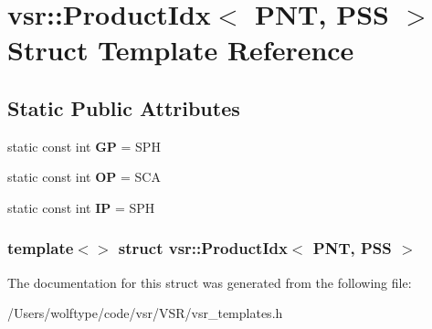 \hypertarget{structvsr_1_1_product_idx_3_01_p_n_t_00_01_p_s_s_01_4}{\section{vsr\-:\-:Product\-Idx$<$ P\-N\-T, P\-S\-S $>$ Struct Template Reference}
\label{structvsr_1_1_product_idx_3_01_p_n_t_00_01_p_s_s_01_4}
}
\subsection*{Static Public Attributes}
\begin{DoxyCompactItemize}
\item 
\hypertarget{structvsr_1_1_product_idx_3_01_p_n_t_00_01_p_s_s_01_4_a52a0db636d39e685db40b9f470a5c3cb}{static const int {\bfseries G\-P} = S\-P\-H}\label{structvsr_1_1_product_idx_3_01_p_n_t_00_01_p_s_s_01_4_a52a0db636d39e685db40b9f470a5c3cb}

\item 
\hypertarget{structvsr_1_1_product_idx_3_01_p_n_t_00_01_p_s_s_01_4_a1d23c22344b64ef632b02d2810049d5f}{static const int {\bfseries O\-P} = S\-C\-A}\label{structvsr_1_1_product_idx_3_01_p_n_t_00_01_p_s_s_01_4_a1d23c22344b64ef632b02d2810049d5f}

\item 
\hypertarget{structvsr_1_1_product_idx_3_01_p_n_t_00_01_p_s_s_01_4_aea2355b37ceef9da8e86bdb0197f6d19}{static const int {\bfseries I\-P} = S\-P\-H}\label{structvsr_1_1_product_idx_3_01_p_n_t_00_01_p_s_s_01_4_aea2355b37ceef9da8e86bdb0197f6d19}

\end{DoxyCompactItemize}
\subsubsection*{template$<$$>$ struct vsr\-::\-Product\-Idx$<$ P\-N\-T, P\-S\-S $>$}



The documentation for this struct was generated from the following file\-:\begin{DoxyCompactItemize}
\item 
/\-Users/wolftype/code/vsr/\-V\-S\-R/vsr\-\_\-templates.\-h\end{DoxyCompactItemize}
